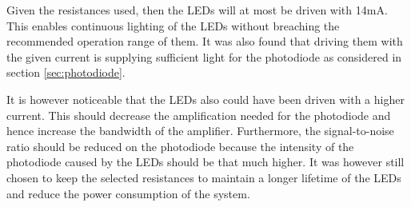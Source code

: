 Given the resistances used, then the LEDs will at most be driven with 14mA.
This enables continuous lighting of the LEDs without breaching the recommended operation range of them.
It was also found that driving them with the given current is supplying sufficient light for the photodiode as considered in section \ref{sec:photodiode}.


It is however noticeable that the LEDs also could have been driven with a higher current.
This should decrease the amplification needed for the photodiode and hence increase the bandwidth of the amplifier.
Furthermore, the signal-to-noise ratio should be reduced on the photodiode because the intensity of the photodiode caused by the LEDs should be that much higher.
It was however still chosen to keep the selected resistances to maintain a longer lifetime of the LEDs and reduce the power consumption of the system.

